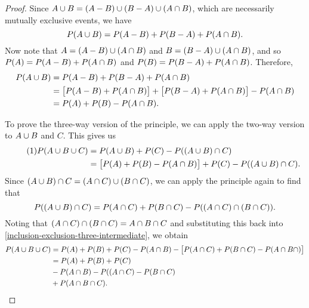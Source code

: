 \begin{proof}
    Since $A \cup B = (A - B) \cup (B - A) \cup (A \cap B)$, which are necessarily mutually exclusive events, we have
    \[P(A \cup B) = P(A - B) + P(B - A) + P(A \cap B).\]
    Now note that $A = (A - B) \cup (A \cap B)$ and $B = (B - A) \cup (A \cap B)$, and so $P(A) = P(A - B) + P(A \cap B)$ and $P(B) = P(B - A) + P(A \cap B)$. Therefore, \begin{align*}
        P(A \cup B) &= P(A - B) + P(B - A) + P(A \cap B) \\
                      &= \big[P(A - B) + P(A \cap B)\big] + \big[P(B - A) + P(A \cap B)\big] - P(A \cap B) \\
                      &= P(A) + P(B) - P(A \cap B).
    \end{align*}

    To prove the three-way version of the principle, we can apply the two-way version to $A \cup B$ and $C$. This gives us
    \begin{align*}\label{inclusion-exclusion-three-intermediate}\tag{$1$}
        P(A \cup B \cup C) &= P(A \cup B) + P(C) - P((A \cup B) \cap C) \\
        &= \big[P(A) + P(B) - P(A \cap B)\big] + P(C) - P((A \cup B) \cap C).
    \end{align*}
    Since $(A \cup B) \cap C = (A \cap C) \cup (B \cap C)$, we can apply the principle again to find that
    \[P((A \cup B) \cap C) = P(A \cap C) + P(B \cap C) - P((A \cap C) \cap (B \cap C)).\] Noting that $(A \cap C) \cap (B \cap C) = A \cap B \cap C$ and substituting this back into \ref{inclusion-exclusion-three-intermediate}, we obtain
    \begin{align*}
        P(A \cup B \cup C) &= P(A) + P(B) + P(C) - P(A \cap B) - \big[P(A \cap C) + P(B \cap C) - P(A \cap B \cap )\big] \\
        &= P(A) + P(B) + P(C) \\
        &- P(A \cap B) - P((A \cap C) - P(B \cap C) \\
        &+ P(A \cap B \cap C).
    \end{align*}
\end{proof}
